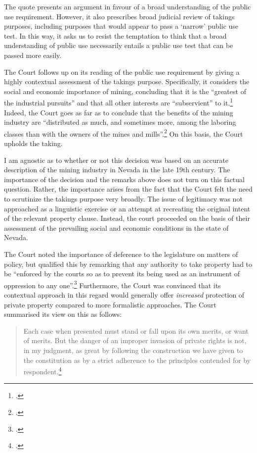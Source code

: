 The quote presents an argument in favour of a broad understanding of the public use requirement. However, it also prescribes broad judicial review of takings purposes, including purposes that would appear to pass a `narrow' public use test. In this way, it asks us to  resist the temptation to think that a broad understanding of public use necessarily entails a public use test that can be passed more easily.

The Court follows up on its reading of the public use requirement by giving a highly contextual assessment of the takings purpose. Specifically, it considers the social and economic importance of mining, concluding that it is the ``greatest of the industrial pursuits'' and that all other interests are ``subservient'' to it.\footcite[409]{seawell76} Indeed, the Court goes as far as to conclude that the benefits of the mining industry are ``distributed as much, and sometimes more, among the laboring classes than with the owners of the mines and mills''.\footcite[409]{seawell76} On this basis, the Court upholds the taking.

I am agnostic as to whether or not this decision was based on an accurate description of the mining industry in Nevada in the late 19th century. The importance of the decision and the remarks above does not turn on this factual question. Rather, the importance arises from the fact that the Court felt the need to scrutinize the takings purpose very broadly. The issue of legitimacy was not approached as a linguistic exercise or an attempt at recreating the original intent of the relevant property clause. Instead, the court proceeded on the basis of their assessment of the prevailing social and economic conditions in the state of Nevada. 

The Court noted the importance of deference to the legislature on matters of policy, but qualified this by remarking that any authority to take property had to be ``enforced by the courts so as to prevent its being used as an instrument of oppression to any one''.\footcite[412]{seawell76} 
Furthermore, the Court was convinced that its contextual approach in this regard would generally offer {\it increased} protection of private property compared to more formalistic approaches. The Court summarised its view on this as follows:

\begin{quote}
Each case when presented must stand or fall upon its own merits, or want of merits. But the danger of an improper invasion of private rights is not, in my judgment, as great by following the construction we have given to the constitution as by a strict adherence to the principles contended for by respondent.\footcite[398]{seawell76}
\end{quote}

